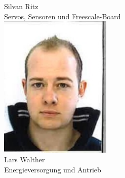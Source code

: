 \begin{minipage}{0.49\textwidth}
\begin{flushleft}
Silvan Ritz\\
Servos, Sensoren und Freescale-Board\\[2ex]
\includegraphics[width=0.4\textwidth]{./04_Projektmanagement/fig/larswalther.jpg}\\
Lars Walther\\
Energieversorgung und Antrieb\\[2ex]
\end{flushleft}
\end{minipage}
\hfill
